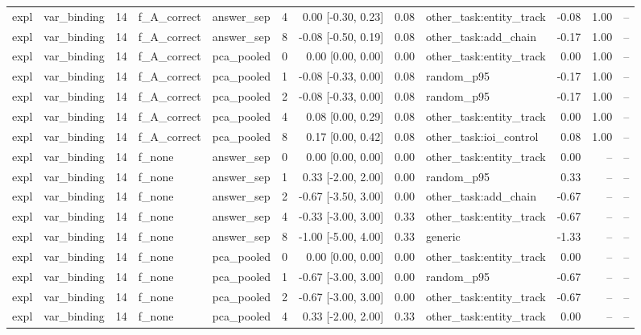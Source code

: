 \begin{tabular}{llrllrrrlrrr}
expl & var\_binding & 14 & f\_A\_correct & answer\_sep & 4 & 0.00 [-0.30, 0.23] & 0.08 & other\_task:entity\_track & -0.08 & 1.00 & -- \\
expl & var\_binding & 14 & f\_A\_correct & answer\_sep & 8 & -0.08 [-0.50, 0.19] & 0.08 & other\_task:add\_chain & -0.17 & 1.00 & -- \\
expl & var\_binding & 14 & f\_A\_correct & pca\_pooled & 0 & 0.00 [0.00, 0.00] & 0.00 & other\_task:entity\_track & 0.00 & 1.00 & -- \\
expl & var\_binding & 14 & f\_A\_correct & pca\_pooled & 1 & -0.08 [-0.33, 0.00] & 0.08 & random\_p95 & -0.17 & 1.00 & -- \\
expl & var\_binding & 14 & f\_A\_correct & pca\_pooled & 2 & -0.08 [-0.33, 0.00] & 0.08 & random\_p95 & -0.17 & 1.00 & -- \\
expl & var\_binding & 14 & f\_A\_correct & pca\_pooled & 4 & 0.08 [0.00, 0.29] & 0.08 & other\_task:entity\_track & 0.00 & 1.00 & -- \\
expl & var\_binding & 14 & f\_A\_correct & pca\_pooled & 8 & 0.17 [0.00, 0.42] & 0.08 & other\_task:ioi\_control & 0.08 & 1.00 & -- \\
expl & var\_binding & 14 & f\_none & answer\_sep & 0 & 0.00 [0.00, 0.00] & 0.00 & other\_task:entity\_track & 0.00 & -- & -- \\
expl & var\_binding & 14 & f\_none & answer\_sep & 1 & 0.33 [-2.00, 2.00] & 0.00 & random\_p95 & 0.33 & -- & -- \\
expl & var\_binding & 14 & f\_none & answer\_sep & 2 & -0.67 [-3.50, 3.00] & 0.00 & other\_task:add\_chain & -0.67 & -- & -- \\
expl & var\_binding & 14 & f\_none & answer\_sep & 4 & -0.33 [-3.00, 3.00] & 0.33 & other\_task:entity\_track & -0.67 & -- & -- \\
expl & var\_binding & 14 & f\_none & answer\_sep & 8 & -1.00 [-5.00, 4.00] & 0.33 & generic & -1.33 & -- & -- \\
expl & var\_binding & 14 & f\_none & pca\_pooled & 0 & 0.00 [0.00, 0.00] & 0.00 & other\_task:entity\_track & 0.00 & -- & -- \\
expl & var\_binding & 14 & f\_none & pca\_pooled & 1 & -0.67 [-3.00, 3.00] & 0.00 & random\_p95 & -0.67 & -- & -- \\
expl & var\_binding & 14 & f\_none & pca\_pooled & 2 & -0.67 [-3.00, 3.00] & 0.00 & other\_task:entity\_track & -0.67 & -- & -- \\
expl & var\_binding & 14 & f\_none & pca\_pooled & 4 & 0.33 [-2.00, 2.00] & 0.33 & other\_task:entity\_track & 0.00 & -- & -- \\

\end{tabular}
